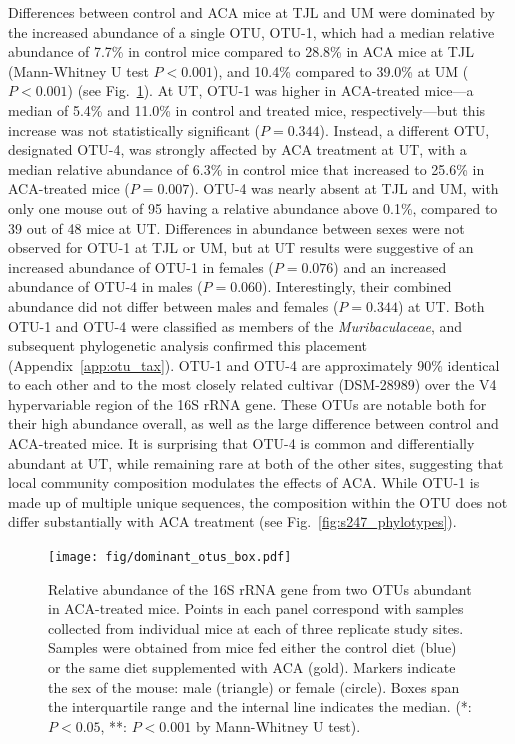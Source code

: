 \documentclass{doc/template/bmcart-nofigbox}
\newcommand{\frnlang}[1]{\textit{#1}}
\newcommand{\taxon}[1]{\frnlang{#1}}
\begin{document}
Differences between control and ACA mice at TJL and UM were dominated by
the increased abundance of a single OTU, OTU-1,
which had a median relative abundance of 7.7\% in control mice
compared to 28.8\% in ACA mice at TJL (Mann-Whitney U test $P < 0.001$),
and 10.4\% compared to 39.0\% at UM ($P < 0.001$) (see
Fig.~\ref{fig:dominant_otus_box}).
At UT, OTU-1 was higher in ACA-treated mice---a median of 5.4\% and 11.0\% in
control and treated mice, respectively---but this increase was not
statistically significant ($P = 0.344$).
Instead, a different OTU, designated OTU-4,
was strongly affected by ACA treatment at UT,
with a median relative abundance of 6.3\% in control mice
that increased to 25.6\% in ACA-treated mice ($P = 0.007$).
OTU-4 was nearly absent at TJL and UM, with only one mouse out of 95
having a relative abundance above 0.1\%,
compared to 39 out of 48 mice at UT\@.
Differences in abundance between sexes were not observed for OTU-1 at TJL or
UM, but at UT results were suggestive of an increased abundance of OTU-1 in
females ($P = 0.076$) and an increased abundance of OTU-4 in males ($P = 0.060$).
Interestingly, their combined abundance did not differ between males and
females ($P = 0.344$) at UT\@.
Both OTU-1 and OTU-4 were classified as members of the \taxon{Muribaculaceae}, and
subsequent phylogenetic analysis confirmed this placement (Appendix~\ref{app:otu_tax}).
OTU-1 and OTU-4 are approximately 90\% identical
to each other and to the most closely related cultivar (DSM-28989)
over the V4 hypervariable region of the 16S rRNA gene.
These OTUs are notable both for their high abundance overall,
as well as the large difference between control and ACA-treated mice.
It is surprising that OTU-4 is common and differentially abundant at UT, while
remaining rare at both of the other sites, suggesting that local community
composition modulates the effects of ACA\@.
While OTU-1 is made up of multiple unique sequences, the composition within the
OTU does not differ substantially with ACA treatment
(see Fig.~\ref{fig:s247_phylotypes}).

\begin{figure}[h!]
  \texttt{[image: fig/dominant\_otus\_box.pdf]}
  \caption{\label{fig:dominant_otus_box}
  Relative abundance of the 16S rRNA gene from two OTUs abundant in ACA-treated
  mice.
  Points in each panel correspond with samples collected from individual mice at
  each of three replicate study sites.
  Samples were obtained from mice fed either the control diet
  (blue)
  or the same diet supplemented with ACA (gold).
  Markers indicate the sex of the mouse: male (triangle) or female (circle).
  Boxes span the interquartile range and the internal line indicates the
  median.
  (*: $P < 0.05$, **: $P < 0.001$ by Mann-Whitney U test).
  }
\end{figure}
\end{document}
